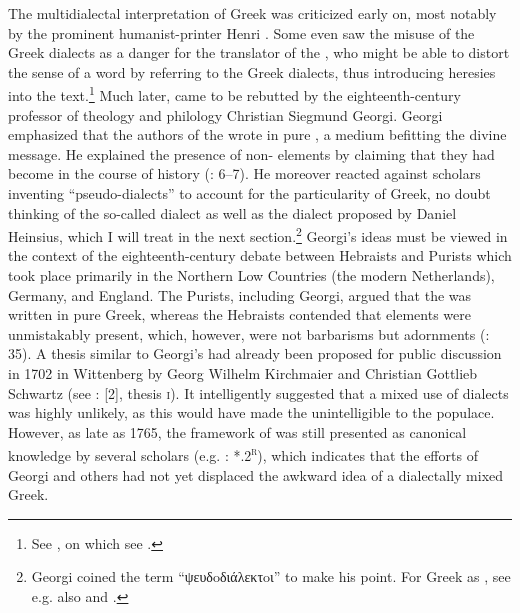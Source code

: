 The multidialectal interpretation of  Greek was criticized early on, most notably by the prominent  humanist-printer Henri \citet[32–33, 138]{Estienne1581}. Some even saw the misuse of the Greek dialects as a danger for the  translator of the , who might be able to distort the sense of a word by referring to the Greek dialects, thus introducing heresies into the text.\footnote{See \citet[429]{Rainolds1583}, on which see \citet[654--655]{VanRooyConsidine2016}.} Much later,  came to be rebutted by the eighteenth-century  professor of theology and philology Christian Siegmund Georgi. Georgi emphasized that the authors of the  wrote in pure , a medium befitting the divine message. He explained the presence of non- elements by claiming that they had become  in the course of history (\citealt{Georgi1733}: 6–7). He moreover reacted against scholars inventing “pseudo-dialects” to account for the particularity of  Greek, no doubt thinking of the so-called  dialect as well as the  dialect proposed by Daniel Heinsius, which I will treat in the next section.\footnote{Georgi coined the term “ψευδoδιάλεκτoι” to make his point. For  Greek as , see e.g. also \citet[3, 10--12]{Georgi1729} and \citet[b.7\textsc{\textsuperscript{r}}–b.8\textsc{\textsuperscript{v}}]{Fischer1754}.} Georgi’s ideas must be viewed in the context of the eighteenth-century debate between Hebraists and Purists which took place primarily in the Northern Low Countries (the modern Netherlands), Germany, and England. The Purists, including Georgi, argued that the  was written in pure Greek, whereas the Hebraists contended that  elements were unmistakably present, which, however, were not barbarisms but adornments (\citealt{De1980}: 35). A thesis similar to Georgi’s had already been proposed for public discussion in 1702 in Wittenberg by Georg Wilhelm Kirchmaier and Christian Gottlieb Schwartz (see \citealt{Kirchmaier1702}: [2], thesis \textsc{i}). It intelligently suggested that a mixed use of dialects was highly unlikely, as this would have made the  unintelligible to the populace. However, as late as 1765, the framework of  was still presented as canonical knowledge by several scholars (e.g. \citealt{Gottleber1765}: *.2\textsc{\textsuperscript{r}}), which indicates that the efforts of Georgi and others had not yet displaced the awkward idea of a dialectally mixed  Greek.

